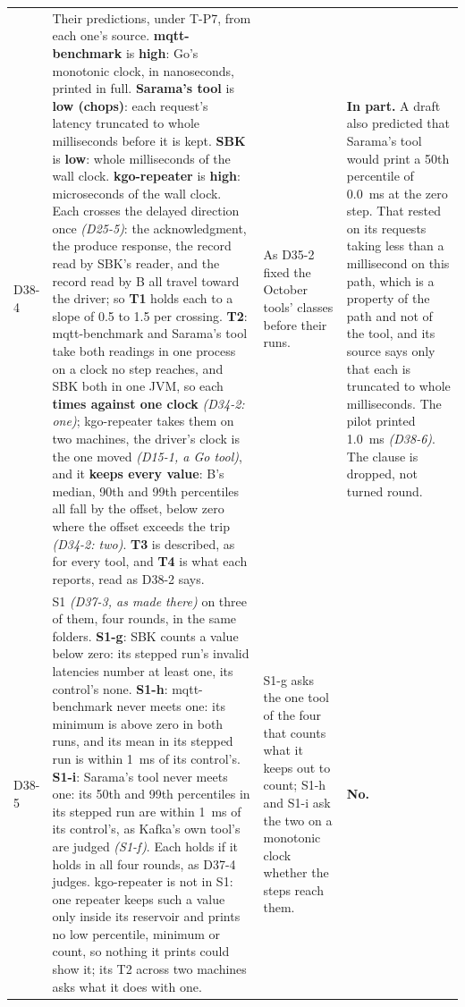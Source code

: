 \documentclass[11pt]{article}
\newcommand{\gl}[1]{{\color{soft}\itshape\small (#1)}}
\begin{document}
{\begin{longtable}{@{}p{1.1cm} >{\raggedright\arraybackslash}p{6.1cm} >{\raggedright\arraybackslash}p{6.0cm} >{\raggedright\arraybackslash}p{2.2cm}@{}}
D38-4 & Their predictions, under T-P7, from each one's source. \textbf{mqtt-benchmark} is \textbf{high}: Go's monotonic clock, in nanoseconds, printed in full. \textbf{Sarama's tool} is \textbf{low (chops)}: each request's latency truncated to whole milliseconds before it is kept. \textbf{SBK} is \textbf{low}: whole milliseconds of the wall clock. \textbf{kgo-repeater} is \textbf{high}: microseconds of the wall clock. Each crosses the delayed direction once \gl{D25-5}: the acknowledgment, the produce response, the record read by SBK's reader, and the record read by B all travel toward the driver; so \textbf{T1} holds each to a slope of 0.5 to 1.5 per crossing. \textbf{T2}: mqtt-benchmark and Sarama's tool take both readings in one process on a clock no step reaches, and SBK both in one JVM, so each \textbf{times against one clock} \gl{D34-2: one}; kgo-repeater takes them on two machines, the driver's clock is the one moved \gl{D15-1, a Go tool}, and it \textbf{keeps every value}: B's median, 90th and 99th percentiles all fall by the offset, below zero where the offset exceeds the trip \gl{D34-2: two}. \textbf{T3} is described, as for every tool, and \textbf{T4} is what each reports, read as D38-2 says. & As D35-2 fixed the October tools' classes before their runs. & \textbf{In part.} A draft also predicted that Sarama's tool would print a 50th percentile of 0.0~ms at the zero step. That rested on its requests taking less than a millisecond on this path, which is a property of the path and not of the tool, and its source says only that each is truncated to whole milliseconds. The pilot printed 1.0~ms \gl{D38-6}. The clause is dropped, not turned round. \\
D38-5 & S1 \gl{D37-3, as made there} on three of them, four rounds, in the same folders. \textbf{S1-g}: SBK counts a value below zero: its stepped run's invalid latencies number at least one, its control's none. \textbf{S1-h}: mqtt-benchmark never meets one: its minimum is above zero in both runs, and its mean in its stepped run is within 1~ms of its control's. \textbf{S1-i}: Sarama's tool never meets one: its 50th and 99th percentiles in its stepped run are within 1~ms of its control's, as Kafka's own tool's are judged \gl{S1-f}. Each holds if it holds in all four rounds, as D37-4 judges. kgo-repeater is not in S1: one repeater keeps such a value only inside its reservoir and prints no low percentile, minimum or count, so nothing it prints could show it; its T2 across two machines asks what it does with one. & S1-g asks the one tool of the four that counts what it keeps out to count; S1-h and S1-i ask the two on a monotonic clock whether the steps reach them. & \textbf{No.} \\

\end{longtable}}
\end{document}
